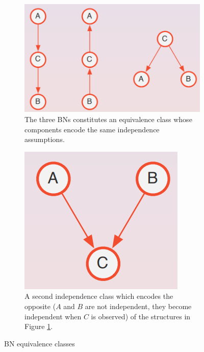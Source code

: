 \begin{figure}
\centering
\begin{subfigure}[t]{0.49\textwidth}
\centering
\includegraphics[width=\textwidth]{images/exampleIEquivalentBN.png}
\caption{The three BNs constitutes an equivalence class whose components encode the same independence assumptions.}
\label{fig:exampleIEquivalentBN}
\end{subfigure}
\hfill
\begin{subfigure}[t]{0.49\textwidth}
\centering
\includegraphics[width=0.7\linewidth]{images/exampleIEquivalentBN2.png}
\caption{A second independence class which encodes the opposite ($A$ and $B$ are not independent, they become independent when $C$ is observed) of the structures in Figure \ref{fig:exampleIEquivalentBN}.}

\label{fig:exampleIEquivalentBN2}
\end{subfigure}

\caption{BN equivalence classes}
\label{fig:BNequivalenceclasses}
\end{figure}

